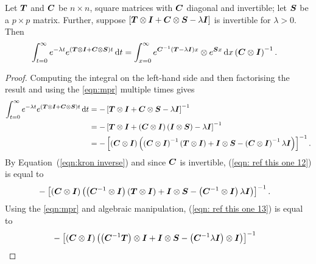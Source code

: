 \begin{lem}\label{lem: lst mpr}
	Let \(\boldsymbol{T}\) and \(\boldsymbol{C}\) be \(n\times n\), square matrices with \(\boldsymbol{C}\) diagonal and invertible; let \(\boldsymbol{S}\) be a \(p\times p\) matrix. Further, suppose \(\left[\boldsymbol{T}\otimes \boldsymbol{I} + \boldsymbol{C}\otimes \boldsymbol{S} - \lambda \boldsymbol{I}\right]\) is invertible for \(\lambda>0\). Then
\begin{align}
	&\int_{t=0}^\infty e^{-\lambda t}  e^{{\left(\boldsymbol{T}\otimes \boldsymbol{I} + \boldsymbol{C}\otimes \boldsymbol{S}\right)t}} \, \mathrm{d} t 
	=   \int_{x=0}^\infty e^{{\boldsymbol{C}^{-1}\left(\boldsymbol{T}-\lambda \boldsymbol{I}\right)x}}\otimes e^{\boldsymbol{S}x} \, \mathrm{d} x \left(\boldsymbol{C}\otimes \boldsymbol{I}\right)^{-1}.  \label{eqn:lstsimplify}\end{align}
\end{lem}
\begin{proof}
	Computing the integral on the left-hand side and then factorising the result and using the \ref{eqn:mpr} multiple times gives
	\begin{align}
            	\int_{t=0}^\infty e^{-\lambda t} e^{\left(\boldsymbol{T}\otimes \boldsymbol{I} + \boldsymbol{C}\otimes \boldsymbol{S}\right)t} \, \mathrm{d} t\nonumber 
            	&= - \left[\boldsymbol{T}\otimes \boldsymbol{I} + \boldsymbol{C}\otimes \boldsymbol{S} - \lambda \boldsymbol{I}\right]^{-1}
		\\&= -  \left[\boldsymbol{T}\otimes \boldsymbol{I} + \left(\boldsymbol{C}\otimes \boldsymbol{I}\right)\left(\boldsymbol{I}\otimes \boldsymbol{S}\right) - \lambda \boldsymbol{I}\right]^{-1}\nonumber
		\\&= -  \left[\left(\boldsymbol{C}\otimes \boldsymbol{I}\right)\left(\left(\boldsymbol{C}\otimes \boldsymbol{I}\right)^{-1}\left(\boldsymbol{T}\otimes \boldsymbol{I} \right)+ \boldsymbol{I}\otimes \boldsymbol{S} - \left(\boldsymbol{C}\otimes \boldsymbol{I}\right)^{-1}\lambda \boldsymbol{I}\right)\right]^{-1}. \label{eqn: ref this one 12}
	\end{align}
	By Equation~(\ref{eqn:kron inverse}) and since \(\boldsymbol{C}\) is invertible, (\ref{eqn: ref this one 12}) is equal to
	\begin{align}
		& - \left[\left(\boldsymbol{C}\otimes \boldsymbol{I}\right)\left(\left(\boldsymbol{C}^{-1}\otimes \boldsymbol{I}\right)\left(\boldsymbol{T}\otimes \boldsymbol{I} \right)+ \boldsymbol{I}\otimes \boldsymbol{S} - \left(\boldsymbol{C}^{-1}\otimes \boldsymbol{I}\right)\lambda \boldsymbol{I}\right)\right]^{-1}. \label{eqn: ref this one 13}
	\end{align}
	{Using the \ref{eqn:mpr} and algebraic manipulation, (\ref{eqn: ref this one 13}) is equal to }
	\begin{align}
		&- \left[\left(\bs{C}\otimes \bs{I}\right)\left(\left(\bs{C}^{-1}\bs{T}\right)\otimes \bs{I} + \bs{I}\otimes \bs{S} - \left(\bs{C}^{-1}\lambda \bs{I}\right)\otimes \bs{I}\right)\right]^{-1} \nonumber

\end{align}
\end{proof}
